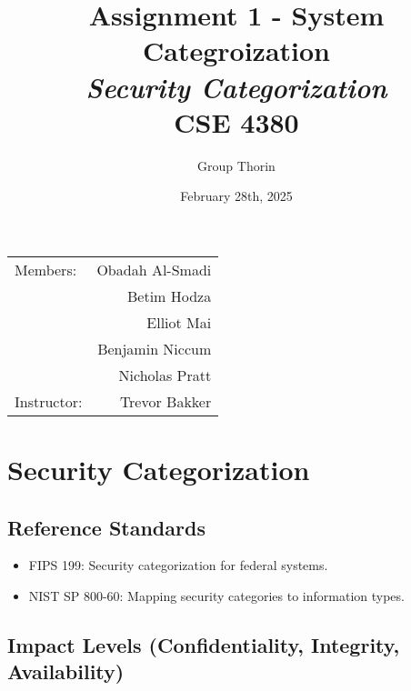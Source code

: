 \documentclass{article}
\title{Assignment 1 - System Categroization \\ \textit{Security Categorization}\\ CSE 4380}
\author{Group Thorin}
\date{February 28th, 2025}
\begin{document}
\maketitle
\begin{center}
\begin{tabular}{l r}

Members: 	& Obadah Al-Smadi\\
			& Betim Hodza\\
			& Elliot Mai\\
			& Benjamin Niccum\\
        	& Nicholas Pratt\\
Instructor: & Trevor Bakker\end{tabular}
\end{center}

\newpage

\setcounter{tocdepth}{2}
\tableofcontents
\newpage

\listoffigures
\listoftables
\newpage

\section{Security Categorization}

\subsection{Reference Standards}
\begin{itemize}
    \item FIPS 199: Security categorization for federal systems.
    \item NIST SP 800-60: Mapping security categories to information types.
\end{itemize}

\subsection{Impact Levels (Confidentiality, Integrity, Availability)}
\end{document}
